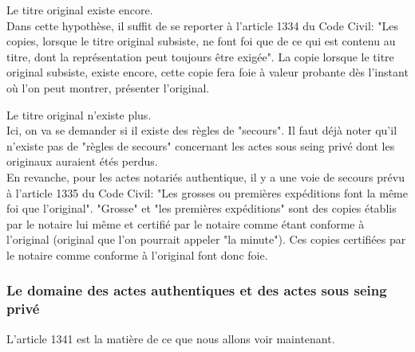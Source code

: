 Le titre original existe encore. \\
Dans cette hypothèse, il suffit de se reporter à l'article 1334 du Code Civil: "Les copies, lorsque le titre original subsiste, ne font foi que de ce qui est contenu au titre, dont la représentation peut toujours être exigée". La copie lorsque le titre original subsiste, existe encore, cette copie fera foie à valeur probante dès l'instant où l'on peut montrer, présenter l'original.


Le titre original n'existe plus. \\
Ici, on va se demander si il existe des règles de "secours". Il faut déjà noter qu'il n'existe pas de "règles de secours" concernant les actes sous seing privé dont les originaux auraient étés perdus. \\ 
En revanche, pour les actes notariés authentique, il y a une voie de secours prévu à l'article 1335 du Code Civil: "Les grosses ou premières expéditions font la même foi que l'original". "Grosse" et "les premières expéditions" sont des copies établis par le notaire lui même et certifié par le notaire comme étant conforme à l'original (original que l'on pourrait appeler "la minute"). Ces copies certifiées par le notaire comme conforme à l'original font donc foie. 

\subsubsection{Le domaine des actes authentiques et des actes sous seing privé}

L'article 1341 est la matière de ce que nous allons voir maintenant.


